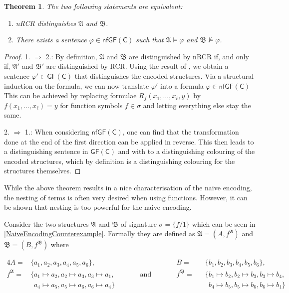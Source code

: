 \documentclass[a4paper,11pt,DIV=15]{scrartcl} %
\renewcommand{\phi}{\varphi}
\theoremstyle{plain}
\newtheorem{theorem}{Theorem}
\theoremstyle{definition}
\newcommand{\GFC}{\mathsf{GF}(\mathsf{C})}
\begin{document}
\begin{theorem}
	The two following statements are equivalent:
	\begin{enumerate}
		\item nRCR distinguishes $\mathfrak A$ and $\mathfrak B$.
		\item There exists a sentence $\phi\in \mathsf{nfGF}(\mathsf C)$ such that $\mathfrak A\models \phi$ and $\mathfrak B\not\models \phi$.
	\end{enumerate}
\end{theorem}
\begin{proof}
	1. $\Rightarrow$ 2.:
	By definition, $\mathfrak A$ and $\mathfrak B$ are distinguished by nRCR if, and only if, $\mathfrak A'$ and $\mathfrak B'$ are distinguished by RCR.
	Using the result of \cite{scheidt2025ColorRefinement}, we obtain a sentence $\varphi'\in\GFC$ that distinguishes the encoded structures.
	Via a structural induction on the formula, we can now translate $\varphi'$ into a formula $\phi\in \mathsf{nfGF}(\mathsf C)$
	This can be achieved by replacing formulae $R_f(x_1,\dots,x_\ell,y)$ by $f(x_1,\dots,x_\ell)=y$ for function symbols $f\in\sigma$ and letting everything else stay the same.
	
	2. $\Rightarrow$ 1.:
	When considering $\mathsf{nfGF}(\mathsf C)$, one can find that the transformation done at the end of the first direction can be applied in reverse.
	This then leads to a distinguishing sentence in $\GFC$ and with \cite{scheidt2025ColorRefinement} to a distinguishing colouring of the encoded structures, which by definition is a distinguishing colouring for the structures themselves.
\end{proof}

While the above theorem results in a nice characterisation of the naive encoding, the nesting of terms is often very desired when using functions.
However, it can be shown that nesting is too powerful for the naive encoding.

Consider the two structures $\mathfrak A$ and $\mathfrak B$ of signature $\sigma=\{f/1\}$ which can be seen in \cref{NaiveEncodingCounterexample}.
Formally they are defined as $\mathfrak A=(A,f^{\mathfrak A})$ and $\mathfrak B = (B, f^{\mathfrak B})$ where

\begin{alignat*}{4}
	A=&\{a_1,a_2,a_3,a_4,a_5,a_6\}, &&  && B=&&\{b_1,b_2,b_3,b_4,b_5,b_6\},\\
	f^{\mathfrak A}=&\{a_1\mapsto a_2, a_2\mapsto a_3, a_3 \mapsto a_1, && \qquad \text{and} \qquad && f^{\mathfrak B}=&&\{b_1 \mapsto b_2, b_2 \mapsto b_3, b_3 \mapsto b_4, \\
	&\phantom{\{} a_4\mapsto a_5, a_5\mapsto a_6, a_6\mapsto a_4 \} &&  && && \phantom{\{} b_4 \mapsto b_5, b_5 \mapsto b_6, b_6 \mapsto b_1\}
\end{alignat*}
\end{document}
